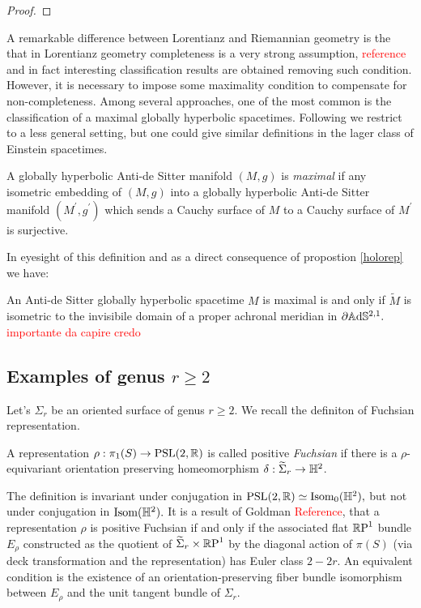 \begin{proof}
    
\end{proof}

A remarkable difference between Lorentianz and Riemannian geometry is the that in Lorentianz geometry completeness is a very strong assumption, \textcolor{red}{reference} and in fact interesting classification results are obtained removing such condition. However, it is necessary to impose some maximality condition to compensate for non-completeness. Among several  approaches, one of the most common is the classification of a maximal globally hyperbolic spacetimes. Following \cite{bonsanteseppi} we restrict to a less general setting, but one could give similar definitions in the lager class of Einstein spacetimes.

\begin{definition}
    A globally hyperbolic Anti-de Sitter manifold $(M,g)$ is \textit{maximal} if any isometric embedding of $(M,g)$ into a globally hyperbolic Anti-de Sitter manifold $(M^{\prime},g^{\prime})$ which sends a Cauchy surface of $M$ to a Cauchy surface of $M^{\prime}$ is surjective.
\end{definition}

In eyesight of this definition and as a direct consequence of propostion \ref{holorep} we have:

\begin{corollary}
An Anti-de Sitter globally hyperbolic spacetime $M$ is maximal is and only if $\tilde{M}$ is isometric to the invisibile domain of a proper achronal meridian in $\partial\mathbb{A}\mathrm{d}\mathbb{S}^{2,1}.$ \textcolor{red}{importante da capire credo}
\end{corollary}



\subsection{Examples of genus $r\geq 2$}
Let's $\Sigma_r$ be an oriented surface of genus $r\geq 2.$ We recall the definiton of Fuchsian representation. 

\begin{definition}
    A representation $\rho:\pi_1(S)\to \text{PSL}(2,\mathbb{R})$ is called positive \textit{Fuchsian} if there is a $\rho$-equivariant orientation preserving homeomorphism $\delta:\widetilde{\Sigma}_r\to\mathbb{H}^2$.
\end{definition}

The definition is invariant under conjugation in $\text{PSL}(2,\mathbb{R})\simeq\text{Isom}_0(\mathbb{H}^2),$ but not under conjugation in $\text{Isom}(\mathbb{H}^2).$ It is a result of Goldman \textcolor{red}{Reference}, that a representation $\rho$ is positive Fuchsian if and only if the associated flat $\mathbb{R}\text{P}^1$ bundle $E_\rho$ constructed as the quotient of $\widetilde{\Sigma}_r\times\mathbb{R}\text{P}^1$ by the diagonal action of $\pi(S)$ (via deck transformation and the representation) has Euler class $2-2r.$ An equivalent condition is the existence of an orientation-preserving fiber bundle isomorphism between $E_\rho$ and the unit tangent bundle of $\Sigma_r.$ \\   

